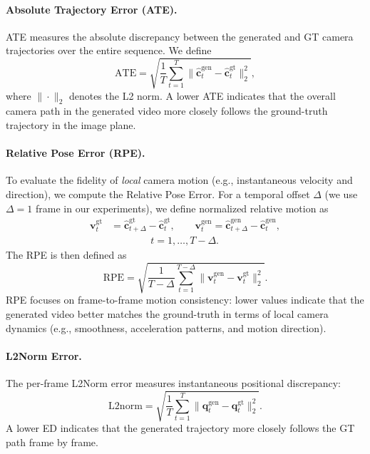 \paragraph{Absolute Trajectory Error (ATE).}
    ATE measures the absolute discrepancy between the generated and GT camera trajectories over the entire sequence. We define
    \[
        \mathrm{ATE}
        =
        \sqrt{
            \frac{1}{T}
            \sum_{t=1}^{T}
            \big\|
                \hat{\mathbf{c}}_t^{\text{gen}} - \hat{\mathbf{c}}_t^{\text{gt}}
            \big\|_2^{2}
        },
    \]
    where $\|\cdot\|_2$ denotes the L2 norm. A lower ATE indicates that the overall camera path in the generated video more closely follows the ground-truth trajectory in the image plane.

    \paragraph{Relative Pose Error (RPE).}
    To evaluate the fidelity of \emph{local} camera motion (e.g., instantaneous velocity and direction), we compute the Relative Pose Error. For a temporal offset $\Delta$ (we use $\Delta = 1$ frame in our experiments), we define normalized relative motion as
    \[
        \begin{aligned}
            \mathbf{v}_t^{\text{gt}}
            &=
            \hat{\mathbf{c}}_{t+\Delta}^{\text{gt}} - \hat{\mathbf{c}}_t^{\text{gt}}, \qquad
            \mathbf{v}_t^{\text{gen}}
            =
            \hat{\mathbf{c}}_{t+\Delta}^{\text{gen}} - \hat{\mathbf{c}}_t^{\text{gen}},
            \\[4pt]
            &\qquad\qquad t = 1,\dots,T-\Delta.
        \end{aligned}
    \]
    The RPE is then defined as
    \[
        \mathrm{RPE}
        =
        \sqrt{
            \frac{1}{T - \Delta}
            \sum_{t=1}^{T-\Delta}
            \big\|
                \mathbf{v}_t^{\text{gen}} - \mathbf{v}_t^{\text{gt}}
            \big\|_2^{2}
        }.
    \]
    RPE focuses on frame-to-frame motion consistency: lower values indicate that the generated video better matches the ground-truth in terms of local camera dynamics (e.g., smoothness, acceleration patterns, and motion direction).

\paragraph{L2Norm Error.}
The per-frame L2Norm error measures instantaneous positional discrepancy:
\[
    \mathrm{L2norm}
    =
    \sqrt{
        \frac{1}{T}
        \sum_{t=1}^{T}
        \big\|
            \mathbf{q}_t^{\text{gen}}
            -
            \mathbf{q}_t^{\text{gt}}
        \big\|_2^2
    }.
\]
A lower ED indicates that the generated trajectory more closely follows the GT path frame by frame.

